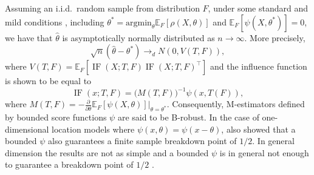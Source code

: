 \documentclass[11pt, oneside]{amsart}
\theoremstyle{definition}   %
\newcommand{\IF}{\operatorname{IF}}
\begin{document}
Assuming an i.i.d.\ random sample from distribution $F$, under some standard and mild conditions \citep[Ch.\ 6]{huber:ronchetti2009}, including $\theta^*=\mbox{argmin}_\theta\mathbb{E}_F[\rho(X,\theta)]$ and $\mathbb{E}_F[\psi(X,\theta^*)]=0$, we have that $\hat\theta$ is asymptotically normally distributed as $n\to\infty$. More precisely,
%
\begin{equation*}
\sqrt{n}(\hat\theta-\theta^*)\to_{d} N(0,V(T,F)),
\end{equation*}
%
where $V(T,F)=\mathbb{E}_F[\IF(X;T,F)\IF(X;T,F)^\top]$ and the influence function is shown to be equal to 
%
 \begin{equation}
 \label{IF}
 \IF(x;T,F)= \Big(M(T,F)\Big)^{-1}\psi(x,T(F)),
 \end{equation}
 where $M(T,F)=-\frac{\partial}{\partial \theta}\mathbb{E}_F[\psi(X,\theta)]\big|_{\theta=\theta^*}$. Consequently,  M-estimators defined by bounded score functions  $\psi$ are said to be B-robust. In the case of one-dimensional location models where $\psi(x,\theta)=\psi(x-\theta)$, \cite{donoho:huber1983, huber1984} also showed that a bounded $\psi$ also guarantees a finite sample breakdown point of $1/2$. In general dimension the results are not as simple and a bounded $\psi$ is in general not enough to guarantee a breakdown point of $1/2$ \citep{maronna1976, rousseeuw:yohai1984,rousseeuw1984,davies1987,yohai1987,lopuhaa:rousseeuw1991}.

 
\end{document}
